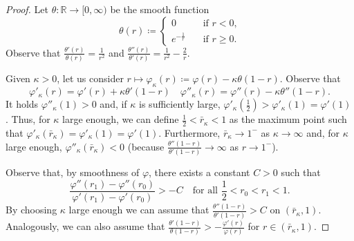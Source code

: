 \documentclass[10pt, reqno]{amsart}
\theoremstyle{plain}
\theoremstyle{remark}
\theoremstyle{definition}
\numberwithin{equation}{section}
\theoremstyle{plain}
\newcommand{\R}{\ensuremath{\mathbb R}} %
\newcommand{\defeq}{\ensuremath{\coloneqq}}%
\begin{document}
\begin{proof}
    Let $\theta:\R\to[0,\infty)$ be the smooth function
    \begin{equation*}
        \theta(r)\defeq
        \begin{cases}
            0 \quad&\text{if $r<0$,} \\
            e^{-\frac1r}\quad&\text{if $r\ge 0$.}
        \end{cases}
    \end{equation*}
    Observe that $\frac{\theta'(r)}{\theta(r)}=\frac1{r^2}$ and $\frac{\theta''(r)}{\theta'(r)}=\frac1{r^2}-\frac2r$.
    
    Given $\kappa>0$, let us consider $r\mapsto \varphi_\kappa(r)\defeq \varphi(r)-\kappa\theta(1-r)$.
    Observe that
    \begin{equation*}
        \varphi'_\kappa(r) = \varphi'(r)+\kappa\theta'(1-r)
        \quad
        \varphi''_\kappa(r) = \varphi''(r) - \kappa\theta''(1-r).
    \end{equation*}
    It holds $\varphi''_\kappa(1)>0$ and, if $\kappa$ is sufficiently large, $\varphi'_\kappa(\frac12)>\varphi'_\kappa(1)=\varphi'(1)$. Thus, for $\kappa$ large enough, we can define $\frac12<\bar r_\kappa<1$ as the maximum point such that $\varphi'_\kappa(\bar r_\kappa)=\varphi'_\kappa(1)=\varphi'(1)$.
    Furthermore, $\bar r_\kappa\to 1^-$ as $\kappa\to \infty$ and, for $\kappa$ large enough, $\varphi''_\kappa(\bar r_\kappa)<0$ (because $\tfrac{\theta''(1-r)}{\theta'(1-r)}\to\infty$ as $r\to 1^-$).

    Observe that, by smoothness of $\varphi$, there exists a constant $C>0$ such that
    \begin{equation*}
        \frac{\varphi''(r_1)-\varphi''(r_0)}{\varphi'(r_1)-\varphi'(r_0)} > -C \quad\text{for all $\frac12<r_0<r_1<1$.}
    \end{equation*}
    By choosing $\kappa$ large enough we can assume that $\frac{\theta''(1-r)}{\theta'(1-r)}>C$ on $(\bar r_\kappa, 1)$. Analogously, we can also assume that $\frac{\theta'(1-r)}{\theta(1-r)}>-\frac{\varphi'(r)}{\varphi(r)}$ for $r\in(\bar r_\kappa, 1)$.


\end{proof}
\end{document}
